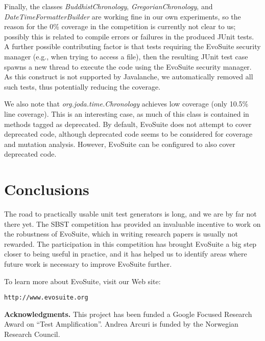 \documentclass[10pt,conference,compsocconf]{IEEEtran}
\newcommand{\EVOSUITE}{{\sc EvoSuite}\xspace}
\begin{document}
Finally, the classes {\it BuddhistChronology}, {\it
  GregorianChronology}, and {\it DateTimeFormatterBuilder} are working
fine in our own experiments, so the reason for the 0\% coverage in the
competition is currently not clear to us; possibly this is related to
compile errors or failures in the produced JUnit tests. A further
possible contributing factor is that tests requiring the \EVOSUITE
security manager (e.g., when trying to access a file), then the
resulting JUnit test case spawns a new thread to execute the code
using the \EVOSUITE security manager. As this construct is not
supported by Javalanche, we automatically removed all such tests, thus
potentially reducing the coverage.

We also note that {\it org.joda.time.Chronology} achieves low coverage
(only 10.5\% line coverage). This is an interesting case, as much of
this class is contained in methods tagged as deprecated. By default,
\EVOSUITE does not attempt to cover deprecated code, although
deprecated code seems to be considered for coverage and mutation
analysis. However, \EVOSUITE can be configured to also cover
deprecated code.


\section{Conclusions}

The road to practically usable unit test generators is long,
and we are by far not there yet. The SBST competition has provided an
invaluable incentive to work on the robustness of \EVOSUITE, which in
writing research papers is usually not rewarded. The participation in
this competition has brought \EVOSUITE a big step closer to being
useful in practice, and it has helped us to identify areas where
future work is necessary to improve \EVOSUITE further.

To learn more about \EVOSUITE, visit our Web site:
\begin{center}
\texttt{http://www.evosuite.org}
\end{center}


\noindent
\textbf{Acknowledgments.}  This project has been funded a Google
Focused Research Award on ``Test Amplification''. Andrea Arcuri is
funded by the Norwegian Research Council.



\def\IEEEbibitemsep{6pt}



\end{document}
